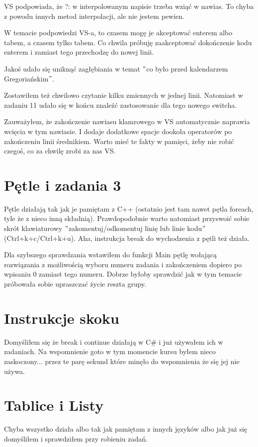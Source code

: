 \documentclass[10pt]{article}
\begin{document}
VS podpowiada, że ?: w interpolowanym napisie trzeba wziąć w nawias. To chyba z powodu innych metod interpolacji, ale nie jestem pewien.

W temacie podpowiedzi VS-a, to czasem mogę je akceptować enterem albo tabem, a czasem tylko tabem. Co chwila próbuję zaakceptować dokończenie kodu enterem i zamiast tego przechodzę do nowej linii.

Jakoś udało się uniknąć zagłębiania w temat $"$co było przed kalendarzem Gregoriańskim$"$.

Zostawiłem też chwilowo czytanie kilku zmiennych w jednej linii. Natomiast w zadaniu 11 udało się w końcu znaleźć zastosowanie dla tego nowego switcha.

Zauważyłem, że zakończenie nawiasu klamrowego w VS automatycznie naprawia wcięcia w tym nawiasie. I dodaje dodatkowe spacje dookoła operatorów po zakończeniu linii średnikiem. Warto mieć te fakty w pamięci, żeby nie robić czegoś, co za chwilę zrobi za nas VS.

\section{Pętle i zadania 3}
Pętle działają tak jak je pamiętam z C++ (ostatnio jest tam nawet pętla foreach, tyle że z nieco inną składnią). Prawdopodobnie warto natomiast przyswoić sobie skrót klawiaturowy $"$zakomentuj/odkomentuj linię lub linie kodu$"$ (Ctrl+k+c/Ctrl+k+u). Aha, instrukcja break do wychodzenia z pętli też działa.

Dla szybszego sprawdzania wstawiłem do funkcji Main pętlę wołającą rozwiązania z możliwością wyboru numeru zadania i zakończeniem dopiero po wpisaniu 0 zamiast tego numeru. Dobrze byłoby sprawdzić jak w tym temacie próbowała sobie upraszczać życie reszta grupy.

\section{Instrukcje skoku}
Domyśliłem się że break i continue działają w C\# i już używałem ich w zadaniach. Na wspomnienie goto w tym momencie kursu byłem nieco zaskoczony... przez te parę sekund które minęło do wspomnienia że się jej nie używa.

\section{Tablice i Listy}
Chyba wszystko działa albo tak jak pamiętam z innych języków albo jak już się domyśliłem i sprawdziłem przy robieniu zadań.
\end{document}
